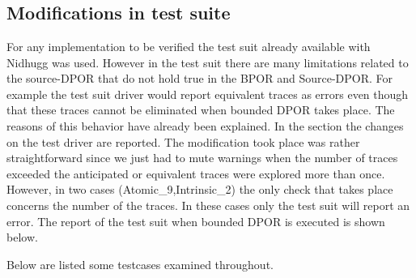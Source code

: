 \documentclass[diploma, english]{softlab-thesis}
\theoremstyle{definition}
\begin{document}

\tableofcontents
\listoftables
\listoffigures
\listoflistings
\listofalgorithms
{}

\mainmatter










\nocite{*}







\backmatter

\appendix

\chapter{ \label{appendix_a}}

\section{Modifications in test suite}
For any implementation to be verified the test suit already available with Nidhugg was used. However in the test suit there are many limitations related to the source-DPOR
that do not hold true in the BPOR and Source-DPOR. For example the test suit driver would report equivalent traces as errors even though that these traces cannot be eliminated 
when bounded DPOR takes place. The reasons of this behavior have already been explained. In the section the changes on the test driver are reported.
The modification took place was rather straightforward since we just had to mute warnings when the number of traces exceeded the anticipated or equivalent traces were explored more than
once. However, in two cases (Atomic\_9,Intrinsic\_2) the only check that takes place concerns the number of the traces. In these cases only the test suit will report an error. 
The report of the test suit when bounded DPOR is executed is shown below.


Below are listed some testcases examined throughout.

%
\end{document}
